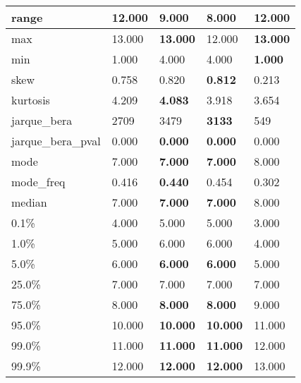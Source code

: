 \begin{table}[H]
\begin{tabular}{|l|m{10em}|m{10em}|m{10em}|m{10em}|}
\hline range & 12.000 & 9.000 & \cellcolor[rgb]{0.9, 0.54, 0.52} 8.000 & \bfseries 12.000 \\
\hline max & 13.000 & \bfseries 13.000 & \cellcolor[rgb]{0.9, 0.54, 0.52} 12.000 & \bfseries 13.000 \\
\hline min & 1.000 & \cellcolor[rgb]{0.9, 0.54, 0.52} 4.000 & \cellcolor[rgb]{0.9, 0.54, 0.52} 4.000 & \bfseries 1.000 \\
\hline skew & 0.758 & 0.820 & \bfseries 0.812 & \cellcolor[rgb]{0.9, 0.54, 0.52} 0.213 \\
\hline kurtosis & 4.209 & \bfseries 4.083 & 3.918 & \cellcolor[rgb]{0.9, 0.54, 0.52} 3.654 \\
\hline jarque\_bera & 2709 & 3479 & \bfseries 3133 & \cellcolor[rgb]{0.9, 0.54, 0.52} 549 \\
\hline jarque\_bera\_pval & 0.000 & \bfseries 0.000 & \bfseries 0.000 & \cellcolor[rgb]{0.9, 0.54, 0.52} 0.000 \\
\hline mode & 7.000 & \bfseries 7.000 & \bfseries 7.000 & \cellcolor[rgb]{0.9, 0.54, 0.52} 8.000 \\
\hline mode\_freq & 0.416 & \bfseries 0.440 & 0.454 & \cellcolor[rgb]{0.9, 0.54, 0.52} 0.302 \\
\hline median & 7.000 & \bfseries 7.000 & \bfseries 7.000 & \cellcolor[rgb]{0.9, 0.54, 0.52} 8.000 \\
\hline 0.1\% & 4.000 & 5.000 & 5.000 & 3.000 \\
\hline 1.0\% & 5.000 & 6.000 & 6.000 & 4.000 \\
\hline 5.0\% & 6.000 & \bfseries 6.000 & \bfseries 6.000 & \cellcolor[rgb]{0.9, 0.54, 0.52} 5.000 \\
\hline 25.0\% & 7.000 & 7.000 & 7.000 & 7.000 \\
\hline 75.0\% & 8.000 & \bfseries 8.000 & \bfseries 8.000 & \cellcolor[rgb]{0.9, 0.54, 0.52} 9.000 \\
\hline 95.0\% & 10.000 & \bfseries 10.000 & \bfseries 10.000 & \cellcolor[rgb]{0.9, 0.54, 0.52} 11.000 \\
\hline 99.0\% & 11.000 & \bfseries 11.000 & \bfseries 11.000 & \cellcolor[rgb]{0.9, 0.54, 0.52} 12.000 \\
\hline 99.9\% & 12.000 & \bfseries 12.000 & \bfseries 12.000 & \cellcolor[rgb]{0.9, 0.54, 0.52} 13.000 \\
\hline
\end{tabular}
\end{table}
